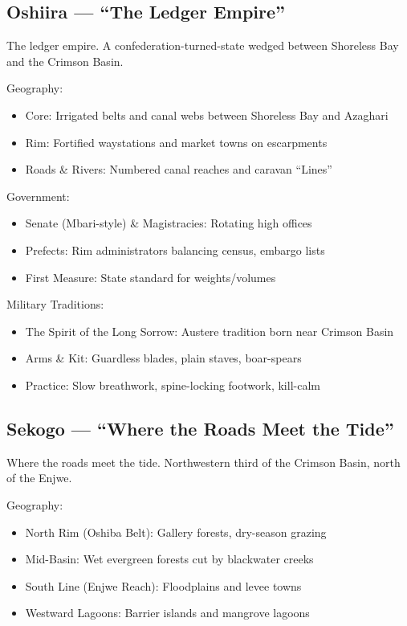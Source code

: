 \subsection{Oshiira --- ``The Ledger Empire''}
\label{sec:oshiira}

The ledger empire. A confederation-turned-state wedged between Shoreless Bay and the Crimson Basin.

Geography:
\begin{itemize}
    \item Core: Irrigated belts and canal webs between Shoreless Bay and Azaghari
    \item Rim: Fortified waystations and market towns on escarpments
    \item Roads \& Rivers: Numbered canal reaches and caravan ``Lines''
\end{itemize}

Government:
\begin{itemize}
    \item Senate (Mbari-style) \& Magistracies: Rotating high offices
    \item Prefects: Rim administrators balancing census, embargo lists
    \item First Measure: State standard for weights/volumes
\end{itemize}

Military Traditions:
\begin{itemize}
    \item The Spirit of the Long Sorrow: Austere tradition born near Crimson Basin
    \item Arms \& Kit: Guardless blades, plain staves, boar-spears
    \item Practice: Slow breathwork, spine-locking footwork, kill-calm
\end{itemize}

\subsection{Sekogo --- ``Where the Roads Meet the Tide''}
\label{sec:sekogo}

Where the roads meet the tide. Northwestern third of the Crimson Basin, north of the Enjwe.

Geography:
\begin{itemize}
    \item North Rim (Oshiba Belt): Gallery forests, dry-season grazing
    \item Mid-Basin: Wet evergreen forests cut by blackwater creeks
    \item South Line (Enjwe Reach): Floodplains and levee towns
    \item Westward Lagoons: Barrier islands and mangrove lagoons
\end{itemize}

